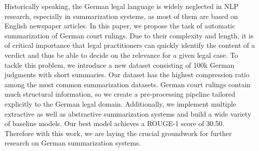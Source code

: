 Historically speaking, the German legal language is widely neglected in NLP research, especially in summarization systems, as most of them are based on English newspaper articles. In this paper, we propose the task of automatic summarization of German court rulings. Due to their complexity and length, it is of critical importance that legal practitioners can quickly identify the content of a verdict and thus be able to decide on the relevance for a given legal case. To tackle this problem, we introduce a new dataset consisting of 100k German judgments with short summaries. Our dataset has the highest compression ratio among the most common summarization datasets. German court rulings contain much structural information, so we create a pre-processing pipeline tailored explicitly to the German legal domain. Additionally, we implement multiple extractive as well as abstractive summarization systems and build a wide variety of baseline models. Our best model achieves a ROUGE-1 score of 30.50. Therefore with this work, we are laying the crucial groundwork for further research on German summarization systems.
